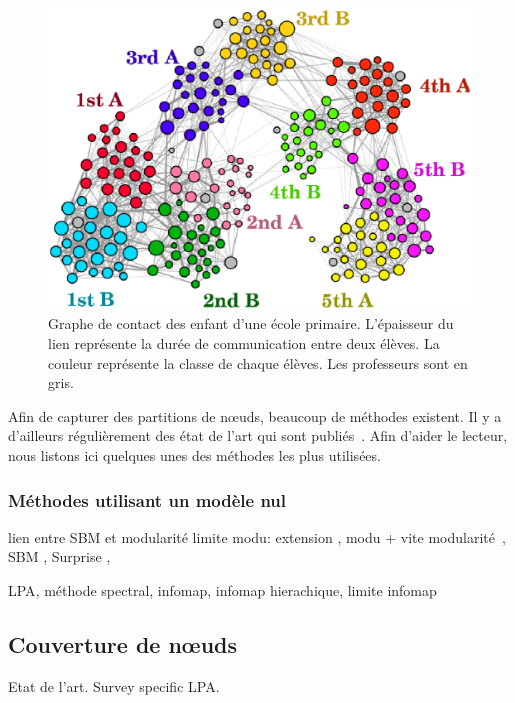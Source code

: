 \begin{figure}
\centering
\includegraphics[width=0.7\linewidth]{img/Intro/ecole_primaire}
\caption{Graphe de contact des enfant d'une école primaire. L'épaisseur du lien représente la durée de communication entre deux élèves. La couleur représente la classe de chaque élèves. Les professeurs sont en gris.\protect\footnotemark}
\label{fig:ecole_primaire}
\end{figure}

Afin de capturer des partitions de n\oe uds, beaucoup de méthodes existent.
Il y a d'ailleurs régulièrement des état de l'art qui sont publiés~\cite{Fortunato2010,Plantie2013a, Malliaros2013a, Harenberg2014a}.
Afin d'aider le lecteur, nous listons ici quelques unes des méthodes les plus utilisées.
\subsubsection{Méthodes utilisant un modèle nul}
lien entre SBM et modularité\cite{Newman2016}
limite modu: \cite{Fortunato2007,Good2010,Lancichinetti2011} extension \cite{Reichardt2006,Delvenne2010}, modu + vite \cite{Huang2015,Blondel2008a,Traag2015a}
modularité~\cite{Newman2004}, SBM \cite{Holland1983a}, Surprise \cite{Aldecoa2011,Traag2015b}, 

 LPA\cite{Raghavan2007a}, méthode spectral, infomap\cite{Rosvall2008}, infomap hierachique\cite{Rosvall2011a}, limite infomap\cite{Kawamoto2015}



\subsection{Couverture de n\oe uds}
\label{subsec:cover}
Etat de l'art.
\cite{Danisch2012, Kanawati2014, Xie2013,Bandyopadhyay2015, Hric2014a}
Survey specific LPA\cite{Kanawati2014}.

